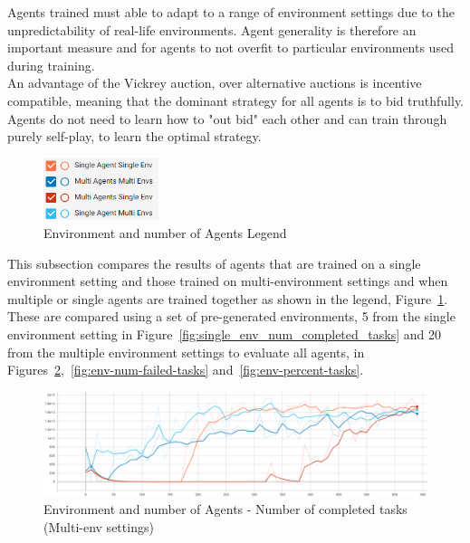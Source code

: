 Agents trained must able to adapt to a range of environment settings due to the unpredictability of real-life
environments. Agent generality is therefore an important measure and for agents to not overfit to particular
environments used during training. \\
An advantage of the Vickrey auction, over alternative auctions is incentive compatible, meaning that the dominant
strategy for all agents is to bid truthfully. Agents do not need to learn how to "out bid" each other and can train
through purely self-play, to learn the optimal strategy.

\begin{figure}
    \includegraphics[width=0.3\textwidth]{figures/5_evaluation_figs/env_agent_num_training_fig/legend.png}
    \caption{Environment and number of Agents Legend}
    \label{fig:env-training-legend}
\end{figure}

This subsection compares the results of agents that are trained on a single environment setting and those
trained on multi-environment settings and when multiple or single agents are trained together as shown in the legend,
Figure~\ref{fig:env-training-legend}. These are compared using a set of pre-generated environments, 5 from the single
environment setting in Figure~\ref{fig:single_env_num_completed_tasks} and 20 from the multiple environment settings to
evaluate all agents, in Figures~\ref{fig:env-num-completed-tasks},~\ref{fig:env-num-failed-tasks}
and~\ref{fig:env-percent-tasks}.

\begin{figure}[H]
    \centering
    \includegraphics[width=\linewidth]{figures/5_evaluation_figs/env_agent_num_training_fig/num_completed_tasks.png}
    \caption{Environment and number of Agents - Number of completed tasks (Multi-env settings)}
    \label{fig:env-num-completed-tasks}
\end{figure}

